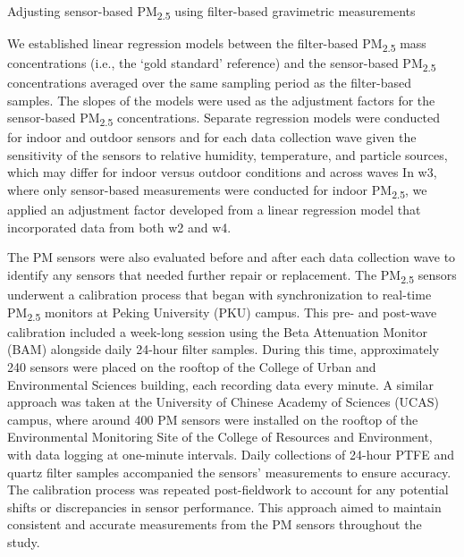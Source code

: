 \documentclass[
  letterpaper,
  DIV=11,
  numbers=noendperiod]{scrartcl}
\makeatletter
\let\oldparagraph\paragraph
\renewcommand{\paragraph}{ %
    \@ifstar %
      \xxxParagraphStar %
      \xxxParagraphNoStar %
  } %
\newcommand{\xxxParagraphStar}[1]{\oldparagraph*{#1}\mbox{}} %
\newcommand{\xxxParagraphNoStar}[1]{\oldparagraph{#1}\mbox{}} %
\providecommand{\DIFaddbegin}{} %
\providecommand{\DIFaddend}{} %
\providecommand{\DIFdelbegin}{} %
\providecommand{\DIFdelend}{} %
\newcommand{\DIFscaledelfig}{0.5}
\newlength{\DIFdelgraphicswidth} %
\newlength{\DIFdelgraphicsheight} %
\newcommand{\DIFaddincludegraphics}[2][]{{\color{blue}\fbox{\DIFOincludegraphics[#1]{#2}}}} %
\newcommand{\DIFdelincludegraphics}[2][]{%
\sbox{\DIFdelgraphicsbox}{\DIFOincludegraphics[#1]{#2}}%
\settoboxwidth{\DIFdelgraphicswidth}{\DIFdelgraphicsbox} %
\settoboxtotalheight{\DIFdelgraphicsheight}{\DIFdelgraphicsbox} %
\scalebox{\DIFscaledelfig}{%
\parbox[b]{\DIFdelgraphicswidth}{\usebox{\DIFdelgraphicsbox}\\[-\baselineskip] \rule{\DIFdelgraphicswidth}{0em}}\llap{\resizebox{\DIFdelgraphicswidth}{\DIFdelgraphicsheight}{%
\setlength{\unitlength}{\DIFdelgraphicswidth}%
\begin{picture}(1,1)%
\thicklines\linethickness{2pt} %
{\color[rgb]{1,0,0}\put(0,0){\framebox(1,1){}}}%
{\color[rgb]{1,0,0}\put(0,0){\line( 1,1){1}}}%
{\color[rgb]{1,0,0}\put(0,1){\line(1,-1){1}}}%
\end{picture}%
}\hspace*{3pt}}} %
} %
\DeclareRobustCommand{\DIFaddbegin}{\DIFOaddbegin \let\includegraphics\DIFaddincludegraphics} %
\DeclareRobustCommand{\DIFaddend}{\DIFOaddend \let\includegraphics\DIFOincludegraphics} %
\DeclareRobustCommand{\DIFdelbegin}{\DIFOdelbegin \let\includegraphics\DIFdelincludegraphics} %
\DeclareRobustCommand{\DIFdelend}{\DIFOaddend \let\includegraphics\DIFOincludegraphics} %
\makeatother
\begin{document}
\DIFdelbegin %
\DIFdelend \DIFaddbegin \paragraph{\texorpdfstring{Adjusting sensor-based PM\textsubscript{2.5}
using filter-based gravimetric
measurements}{Adjusting sensor-based PM2.5 using filter-based gravimetric measurements}}\label{adjusting-sensor-based-pm2.5-using-filter-based-gravimetric-measurements}
\DIFaddend 

We established linear regression models between the filter-based
PM\textsubscript{2.5} mass concentrations (i.e., the `gold standard'
reference) and the sensor-based PM\textsubscript{2.5} concentrations
averaged over the same sampling period as the filter-based samples. The
slopes of the models were used as the adjustment factors for the
sensor-based PM\textsubscript{2.5} concentrations. Separate regression
models were conducted for indoor and outdoor sensors and for each data
collection wave given the sensitivity of the sensors to relative
humidity, temperature, and particle sources, which may differ for indoor
versus outdoor conditions and across waves In w3, where only
sensor-based measurements were conducted for indoor
PM\textsubscript{2.5}, we applied an adjustment factor developed from a
linear regression model that incorporated data from both w2 and w4.

The PM sensors were also evaluated before and after each data collection
wave to identify any sensors that needed further repair or replacement.
The PM\textsubscript{2.5} sensors underwent a calibration process that
began with synchronization to real-time PM\textsubscript{2.5} monitors
at Peking University (PKU) campus. This pre- and post-wave calibration
included a week-long session using the Beta Attenuation Monitor (BAM)
alongside daily 24-hour filter samples. During this time, approximately
240 sensors were placed on the rooftop of the College of Urban and
Environmental Sciences building, each recording data every minute. A
similar approach was taken at the University of Chinese Academy of
Sciences (UCAS) campus, where around 400 PM sensors were installed on
the rooftop of the Environmental Monitoring Site of the College of
Resources and Environment, with data logging at one-minute intervals.
Daily collections of 24-hour PTFE and quartz filter samples accompanied
the sensors' measurements to ensure accuracy. The calibration process
was repeated post-fieldwork to account for any potential shifts or
discrepancies in sensor performance. This approach aimed to maintain
consistent and accurate measurements from the PM sensors throughout the
study.
\end{document}
